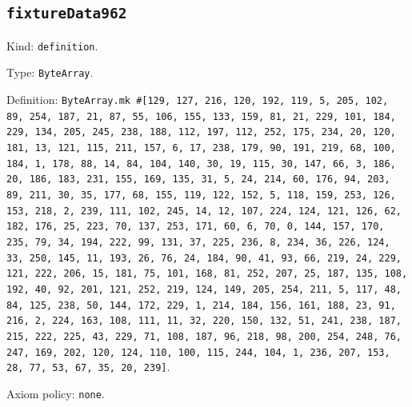 \documentclass[11pt]{article}
\begin{document}
\subsection*{\texttt{fixtureData962}}
\noindent Kind: \texttt{definition}.\par
\noindent Type: \texttt{ByteArray}.\par
\noindent Definition: \texttt{ByteArray.mk \#[129, 127, 216, 120, 192, 119, 5, 205, 102, 89, 254, 187, 21, 87, 55, 106, 155, 133, 159, 81, 21, 229, 101, 184, 229, 134, 205, 245, 238, 188, 112, 197, 112, 252, 175, 234, 20, 120, 181, 13, 121, 115, 211, 157, 6, 17, 238, 179, 90, 191, 219, 68, 100, 184, 1, 178, 88, 14, 84, 104, 140, 30, 19, 115, 30, 147, 66, 3, 186, 20, 186, 183, 231, 155, 169, 135, 31, 5, 24, 214, 60, 176, 94, 203, 89, 211, 30, 35, 177, 68, 155, 119, 122, 152, 5, 118, 159, 253, 126, 153, 218, 2, 239, 111, 102, 245, 14, 12, 107, 224, 124, 121, 126, 62, 182, 176, 25, 223, 70, 137, 253, 171, 60, 6, 70, 0, 144, 157, 170, 235, 79, 34, 194, 222, 99, 131, 37, 225, 236, 8, 234, 36, 226, 124, 33, 250, 145, 11, 193, 26, 76, 24, 184, 90, 41, 93, 66, 219, 24, 229, 121, 222, 206, 15, 181, 75, 101, 168, 81, 252, 207, 25, 187, 135, 108, 192, 40, 92, 201, 121, 252, 219, 124, 149, 205, 254, 211, 5, 117, 48, 84, 125, 238, 50, 144, 172, 229, 1, 214, 184, 156, 161, 188, 23, 91, 216, 2, 224, 163, 108, 111, 11, 32, 220, 150, 132, 51, 241, 238, 187, 215, 222, 225, 43, 229, 71, 108, 187, 96, 218, 98, 200, 254, 248, 76, 247, 169, 202, 120, 124, 110, 100, 115, 244, 104, 1, 236, 207, 153, 28, 77, 53, 67, 35, 20, 239]}.\par
\noindent Axiom policy: \texttt{none}.\par
\end{document}
